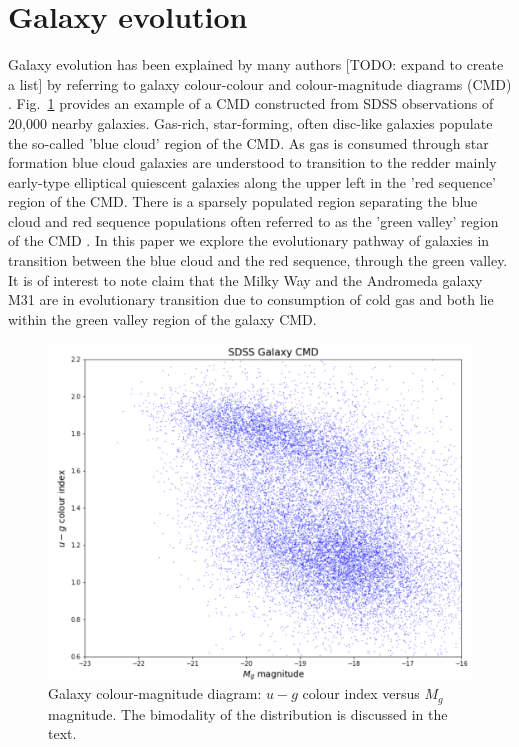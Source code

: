 \section{Galaxy evolution}
\label{sec:evolution}

Galaxy evolution has been explained by many authors [TODO: expand to create a list] \citep{baldry2004quantifying,2006MNRAS.373..469B} by referring to galaxy colour-colour and colour-magnitude diagrams (CMD) \citep[see e.g.][]{2001AJ....122.1861S, 2003ApJ...585L...5H, 2003ApJS..149..289B}. Fig.~\ref{fig:CMD1} provides an example of a CMD constructed from SDSS observations of 20,000 nearby galaxies. Gas-rich, star-forming, often disc-like galaxies populate the so-called 'blue cloud' region of the CMD. As gas is consumed through star formation blue cloud galaxies are understood to transition to the redder mainly early-type elliptical quiescent galaxies along the upper left in the 'red sequence' region of the CMD. There is a sparsely populated region separating the blue cloud and red sequence populations often referred to as the 'green valley' region of the CMD  \citep{2004ApJ...608..752B}. In this paper we explore the evolutionary pathway of galaxies in transition between the blue cloud and the red sequence, through the green valley.
It is of interest to note \citet{Mutch_2011} claim that the Milky Way and the Andromeda galaxy M31 are in evolutionary transition due to consumption of cold gas and both lie within the green valley region of the galaxy CMD.

\begin{figure}
	\includegraphics[width=\columnwidth]{images/CMDs/galaxyCMD.PNG}
    \caption{Galaxy colour-magnitude diagram: $u-g$ colour index versus $M_g$ magnitude. The bimodality of the distribution is discussed in the text.}
    \label{fig:CMD1}
\end{figure}